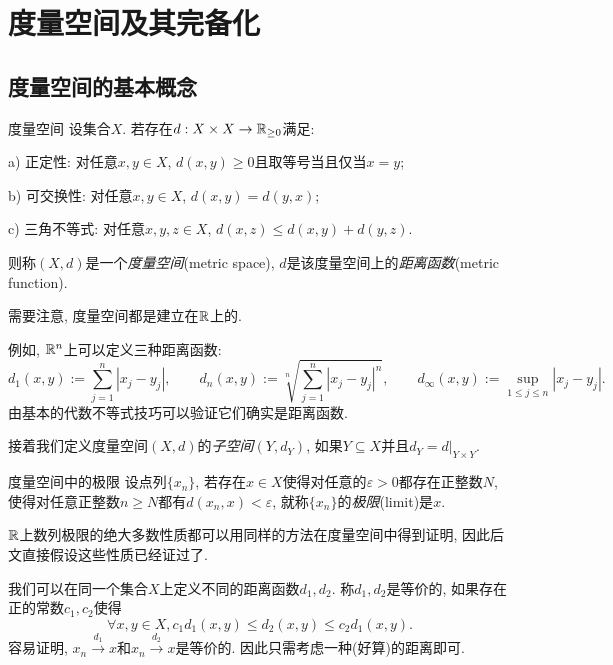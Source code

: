\newpage
\section{度量空间及其完备化}

\subsection{度量空间的基本概念}

\begin{definition}{度量空间}
	设集合$X$. 若存在$d:X \times X \to \mathbb{R} _{\geq 0}$满足: 
	
	a) 正定性: 对任意$x,y \in X$, $d(x,y)\geq 0$且取等号当且仅当$x=y$; 
	
	b) 可交换性: 对任意$x,y \in X$, $d(x,y)=d(y,x)$; 
	
	c) 三角不等式: 对任意$x,y,z \in X$, $d(x,z) \leq d(x,y)+d(y,z)$. 
	
	\noindent
	则称$(X,d)$是一个\textit{度量空间}(metric space), $d$是该度量空间上的\textit{距离函数}(metric function). 
\end{definition}
\begin{remark}
	需要注意, 度量空间都是建立在$\mathbb{R}$上的. 
\end{remark}

例如, $\mathbb{R} ^n$上可以定义三种距离函数: $$d_1(x,y) := \sum_{j=1}^n |x_j-y_j|,\qquad d_n(x,y) := \sqrt[n]{\sum_{j=1}^n |x_j-y_j|^n},\qquad d_{\infty}(x,y) := \sup_{1 \leq j \leq n}|x_j-y_j|. $$
由基本的代数不等式技巧可以验证它们确实是距离函数. 

接着我们定义度量空间$(X,d)$的\textit{子空间}$(Y,d_Y)$, 如果$Y \subseteq X$并且$d_Y = d|_{Y \times Y}$. 

\begin{definition}{度量空间中的极限}
	设点列$\{ x_n \}$, 若存在$x \in X$使得对任意的$\varepsilon >0$都存在正整数$N$, 使得对任意正整数$n\geq N$都有$d(x_n,x)<\varepsilon$, 就称$\{ x_n \}$的\textit{极限}(limit)是$x$. 
\end{definition}
\begin{remark}
	$\mathbb{R}$上数列极限的绝大多数性质都可以用同样的方法在度量空间中得到证明, 因此后文直接假设这些性质已经证过了. 
\end{remark}

我们可以在同一个集合$X$上定义不同的距离函数$d_1,d_2$. 称$d_1,d_2$是等价的, 如果存在正的常数$c_1,c_2$使得$$\forall x,y \in X, c_1d_1(x,y) \leq d_2(x,y) \leq c_2d_1(x,y).$$
容易证明, $x_n \stackrel{d_1}{\longrightarrow} x$和$x_n \stackrel{d_2}{\longrightarrow} x$是等价的. 因此只需考虑一种(好算)的距离即可. 

